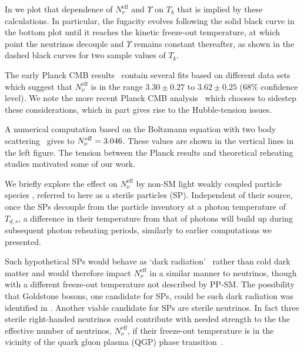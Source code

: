 In  we plot that dependence of $N^{\mathrm{eff}}_\nu$ and $\Upsilon$ on $T_k$ that is implied by these calculations. In particular, the fugacity evolves following the solid black curve in the bottom plot until it reaches the kinetic freeze-out temperature, at which point the neutrinos decouple and $\Upsilon$ remains constant thereafter, as shown in the dashed black curves for two sample values of $T_k$. 
 
The early Planck CMB results~\cite{Planck:2013pxb} contain several fits based on different data sets which suggest that $N^{\mathrm{eff}}_\nu$ is in the range $3.30\pm 0.27$ to $3.62\pm0.25$ ($68\%$ confidence level). We note the more recent Planck CMB analysis~\cite{Planck:2018vyg} which chooses to sidestep these considerations, which in part gives rise to the Hubble-tension issues.

A numerical computation based on the Boltzmann equation with two body scattering~\cite{Mangano:2005cc} gives to $N_{\nu}^{\rm eff}=3.046$. These values are shown in the vertical lines in the left figure. The tension between the Planck results and theoretical reheating studies motivated some of our work.

We  briefly explore  the effect on $N_\nu^{\text{eff}}$ by non-SM light weakly coupled particle species \cite{Birrell:2014cja}, referred to here as a sterile particles (SP). Independent of their source, once the SPs decouple from the particle inventory at a photon temperature of $T_{d,s}$, a difference in their temperature from that of photons will build up during subsequent photon reheating periods, similarly to earlier computations we presented.

Such hypothetical SPs would behave as `dark radiation'~\cite{Steigman:2013yua} rather than cold dark matter and would therefore impact $N_\nu^{\text{eff}}$ in a similar manner to neutrinos, though with a different freeze-out temperature not described by PP-SM.  The possibility that Goldstone bosons, one candidate for SPs, could be such dark radiation was identified in \cite{Weinberg:2013kea}. Another viable candidate for SPs are sterile neutrinos. In fact three sterile right-handed neutrinos could contribute with needed strength to the the effective number of neutrinos, $N^{\text{eff}}_{\nu}$, if their freeze-out temperature is in the vicinity of the quark gluon plasma (QGP) phase transition~\cite{Anchordoqui:2011nh,Anchordoqui:2012qu}. 

